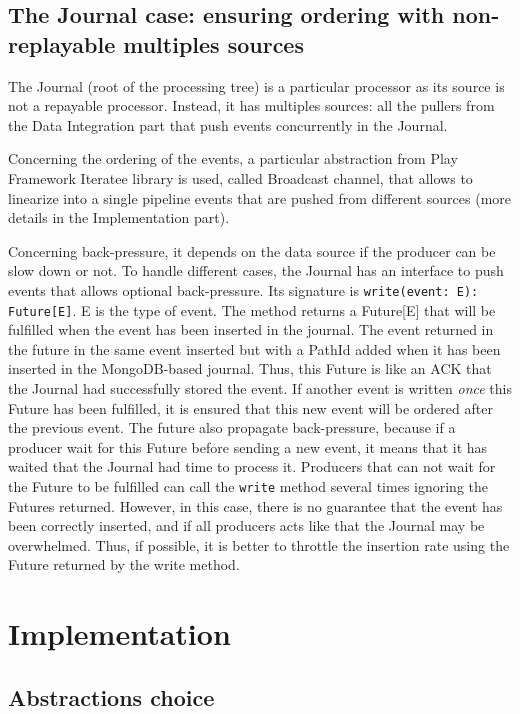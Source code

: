 \subsection{The Journal case: ensuring ordering with non-replayable multiples sources}

The Journal (root of the processing tree) is a particular processor as its source is not a repayable processor. Instead, it has multiples sources: all the pullers from the Data
Integration part that push events concurrently in the Journal.

Concerning the ordering of the events, a particular abstraction from Play Framework Iteratee library is used, called Broadcast channel, that allows to linearize into a single pipeline events that are pushed from different sources (more details in the Implementation part).

Concerning back-pressure, it depends on the data source if the producer can be slow down or not. To handle different cases, the Journal has an interface to push events that allows optional back-pressure. Its signature is \verb|write(event: E): Future[E]|. E is the type of event. The method returns a Future[E] that will be fulfilled when the event has been inserted in the journal. The event returned in the future in the same event inserted but with a PathId added when it has been inserted in the MongoDB-based journal.
Thus, this Future is like an ACK that the Journal had successfully stored the event. If another event is written \textit{once} this Future has been fulfilled, it is ensured
that this new event will be ordered after the previous event. The future also propagate back-pressure, because if a producer wait for this Future before sending a new event, it means that it has waited that the Journal had time to process it. Producers that can not wait for the Future to be fulfilled can call the \verb|write| method several times
ignoring the Futures returned. However, in this case, there is no guarantee that the event has been correctly inserted, and if all producers acts like that the Journal may be overwhelmed. Thus, if possible, it is better to throttle the insertion rate using the Future returned by the write method.

\section{Implementation}
\label{sec:streamimplementation}

\subsection{Abstractions choice}

